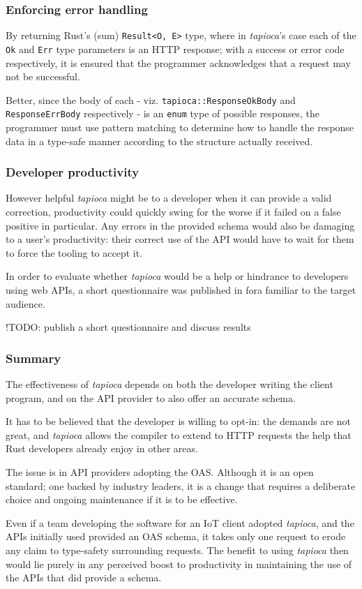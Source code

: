\subsubsection{Enforcing error handling} \label{concl:eval:err-handle}

By returning Rust's (sum) \texttt{Result<O, E>} type, where in \emph{tapioca}'s case each of the \texttt{Ok} and \texttt{Err} type parameters is an HTTP response; with a success or error code respectively, it is ensured that the programmer acknowledges that a request may not be successful.

Better, since the body of each - viz. \texttt{tapioca::ResponseOkBody} and \texttt{ResponseErrBody} respectively - is an \texttt{enum} type of possible responses, the programmer must use pattern matching to determine how to handle the response data in a type-safe manner according to the structure actually received.

\subsubsection{Developer productivity} \label{concl:eval:productivity}

However helpful \emph{tapioca} might be to a developer when it can provide a valid correction, productivity could quickly swing for the worse if it failed on a false positive in particular. Any errors in the provided schema would also be damaging to a user's productivity: their correct use of the API would have to wait for them to force the tooling to accept it.

In order to evaluate whether \emph{tapioca} would be a help or hindrance to developers using web APIs, a short questionnaire was published in fora familiar to the target audience.

!TODO: publish a short questionnaire and discuss results

\subsubsection{Summary} \label{concl:eval:summary}

The effectiveness of \emph{tapioca} depends on both the developer writing the client program, and on the API provider to also offer an accurate schema.

It has to be believed that the developer is willing to opt-in: the demands are not great, and \emph{tapioca} allows the compiler to extend to HTTP requests the help that Rust developers already enjoy in other areas.

The issue is in API providers adopting the OAS. Although it is an open standard; one backed by industry leaders, it is a change that requires a deliberate choice and ongoing maintenance if it is to be effective.

Even if a team developing the software for an IoT client adopted \emph{tapioca}, and the APIs initially used provided an OAS schema, it takes only one request to erode any claim to type-safety surrounding requests. The benefit to using \emph{tapioca} then would lie purely in any perceived boost to productivity in maintaining the use of the APIs that did provide a schema.
